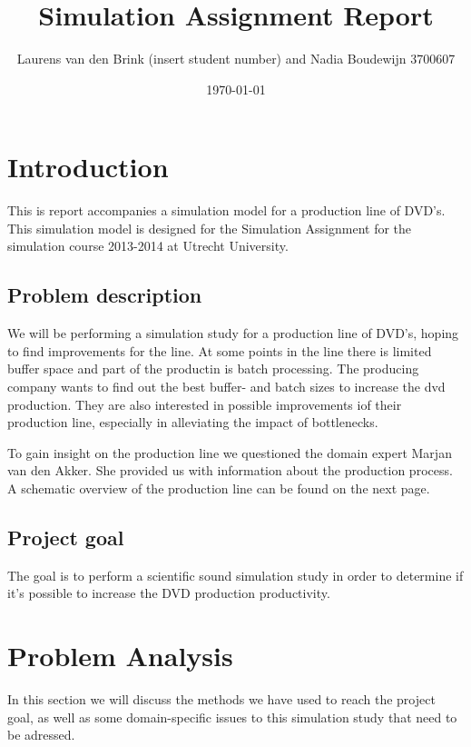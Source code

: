 \documentclass[11pt,a4paper]{article}
\title{Simulation Assignment Report}
\author{Laurens van den Brink (insert student number) and Nadia Boudewijn 3700607}
\date{\today}
\begin{document}
\begin{titlepage}
\maketitle{}
\end{titlepage}


\tableofcontents
\clearpage



\section{Introduction}
This is report accompanies a simulation model for a production line of DVD's. This simulation model is designed for the Simulation Assignment for the simulation course  2013-2014 at Utrecht University.
\subsection{Problem description}
We will be performing a simulation study for a production line of DVD's, hoping to find improvements for the line. At some points in the line there is limited buffer space and part of the productin is batch processing. The producing company wants to find out the best buffer- and batch sizes to increase the dvd production. They are also interested in possible improvements iof their production line, especially in alleviating the impact of bottlenecks. 

To gain insight on the production line we questioned the domain expert Marjan van den Akker. She provided us with information about the production process. A schematic overview of the production line can be found on the next page. 
\subsection{Project goal}
The goal is to perform a scientific sound simulation study in order to determine if it's possible to increase the DVD production productivity. 
\section{Problem Analysis}
In this section we will discuss the methods we have used to reach the project goal, as well as some domain-specific issues to this simulation study that need to be adressed. 
\end{document}
